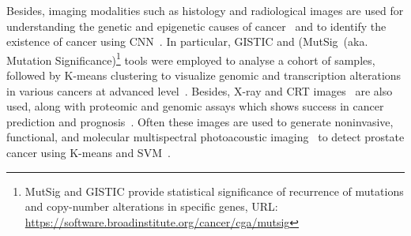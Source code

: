 \hspace*{3.5mm} Besides, imaging modalities such as histology and radiological images are used for understanding the genetic and epigenetic causes of cancer~\cite{yuan2018cancer,20Rajanna,23Zheng} and to identify the existence of cancer using CNN~\cite{19Cruz,xu}. In particular, GISTIC and (MutSig~(aka. Mutation Significance)\footnote{MutSig and GISTIC provide statistical significance of recurrence of mutations and copy-number alterations in specific genes, URL: \url{https://software.broadinstitute.org/cancer/cga/mutsig}} tools were employed to analyse a cohort of samples, followed by K-means clustering to visualize genomic and transcription alterations in various cancers at advanced level~\cite{wb}. Besides, X-ray and CRT images~\cite{25Cruz} are also used, along with proteomic and genomic assays which shows success in cancer prediction and prognosis~\cite{28Zhou}. Often these images are used to generate noninvasive, functional, and molecular multispectral photoacoustic imaging~\cite{20Rajanna} to detect prostate cancer using K-means and SVM~\cite{23Zheng}. %

